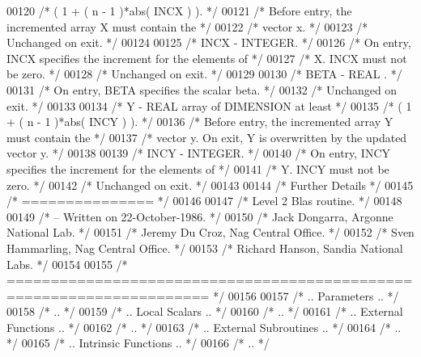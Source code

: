 \begin{DoxyCode}
00120 \textcolor{comment}{/*           ( 1 + ( n - 1 )*abs( INCX ) ). */}
00121 \textcolor{comment}{/*           Before entry, the incremented array X must contain the */}
00122 \textcolor{comment}{/*           vector x. */}
00123 \textcolor{comment}{/*           Unchanged on exit. */}
00124 
00125 \textcolor{comment}{/*  INCX   - INTEGER. */}
00126 \textcolor{comment}{/*           On entry, INCX specifies the increment for the elements of */}
00127 \textcolor{comment}{/*           X. INCX must not be zero. */}
00128 \textcolor{comment}{/*           Unchanged on exit. */}
00129 
00130 \textcolor{comment}{/*  BETA   - REAL            . */}
00131 \textcolor{comment}{/*           On entry, BETA specifies the scalar beta. */}
00132 \textcolor{comment}{/*           Unchanged on exit. */}
00133 
00134 \textcolor{comment}{/*  Y      - REAL             array of DIMENSION at least */}
00135 \textcolor{comment}{/*           ( 1 + ( n - 1 )*abs( INCY ) ). */}
00136 \textcolor{comment}{/*           Before entry, the incremented array Y must contain the */}
00137 \textcolor{comment}{/*           vector y. On exit, Y is overwritten by the updated vector y. */}
00138 
00139 \textcolor{comment}{/*  INCY   - INTEGER. */}
00140 \textcolor{comment}{/*           On entry, INCY specifies the increment for the elements of */}
00141 \textcolor{comment}{/*           Y. INCY must not be zero. */}
00142 \textcolor{comment}{/*           Unchanged on exit. */}
00143 
00144 \textcolor{comment}{/*  Further Details */}
00145 \textcolor{comment}{/*  =============== */}
00146 
00147 \textcolor{comment}{/*  Level 2 Blas routine. */}
00148 
00149 \textcolor{comment}{/*  -- Written on 22-October-1986. */}
00150 \textcolor{comment}{/*     Jack Dongarra, Argonne National Lab. */}
00151 \textcolor{comment}{/*     Jeremy Du Croz, Nag Central Office. */}
00152 \textcolor{comment}{/*     Sven Hammarling, Nag Central Office. */}
00153 \textcolor{comment}{/*     Richard Hanson, Sandia National Labs. */}
00154 
00155 \textcolor{comment}{/*  ===================================================================== */}
00156 
00157 \textcolor{comment}{/*     .. Parameters .. */}
00158 \textcolor{comment}{/*     .. */}
00159 \textcolor{comment}{/*     .. Local Scalars .. */}
00160 \textcolor{comment}{/*     .. */}
00161 \textcolor{comment}{/*     .. External Functions .. */}
00162 \textcolor{comment}{/*     .. */}
00163 \textcolor{comment}{/*     .. External Subroutines .. */}
00164 \textcolor{comment}{/*     .. */}
00165 \textcolor{comment}{/*     .. Intrinsic Functions .. */}
00166 \textcolor{comment}{/*     .. */}

\end{DoxyCode}
